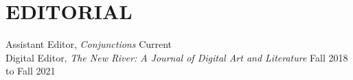 \section{EDITORIAL}

Assistant Editor, \emph{Conjunctions}
 \hfill Current \\


Digital Editor, \emph{The New River: A Journal of Digital Art and Literature}
 \hfill Fall 2018 to Fall 2021 \\
 
% 
 
